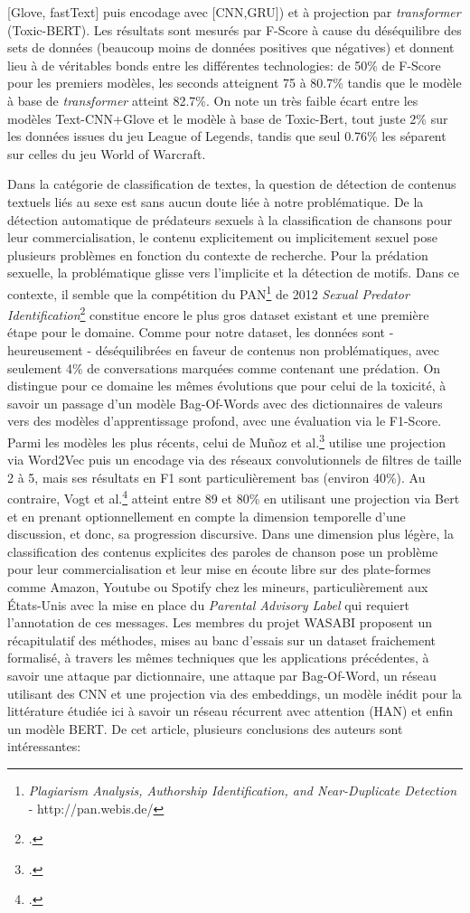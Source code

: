 [Glove, fastText] puis encodage avec [CNN,GRU]) et à projection par \textit{transformer} (Toxic-BERT). Les résultats sont mesurés par F-Score à cause du déséquilibre des sets de données (beaucoup moins de données positives que négatives) et donnent lieu à de véritables bonds entre les différentes technologies: de 50\% de F-Score pour les premiers modèles, les seconds atteignent 75 à 80.7\% tandis que le modèle à base de \textit{transformer} atteint 82.7\%. On note un très faible écart entre les modèles Text-CNN+Glove et le modèle à base de Toxic-Bert, tout juste 2\% sur les données issues du jeu League of Legends, tandis que seul 0.76\% les séparent sur celles du jeu World of Warcraft.

Dans la catégorie de classification de textes, la question de détection de contenus textuels liés au sexe est sans aucun doute liée à notre problématique. De la détection automatique de prédateurs sexuels à la classification de chansons pour leur commercialisation, le contenu explicitement ou implicitement sexuel pose plusieurs problèmes en fonction du contexte de recherche. Pour la prédation sexuelle, la problématique glisse vers l'implicite et la détection de motifs. Dans ce contexte, il semble que la compétition du PAN\footnote{\textit{Plagiarism Analysis, Authorship Identification, and Near-Duplicate Detection} - http://pan.webis.de/} de 2012 \textit{Sexual Predator Identification}\footcite{inches_overview_2012} constitue encore le plus gros dataset existant et une première étape pour le domaine. Comme pour notre dataset, les données sont - heureusement - déséquilibrées en faveur de contenus non problématiques, avec seulement 4\% de conversations marquées comme contenant une prédation. On distingue pour ce domaine les mêmes évolutions que pour celui de la toxicité, à savoir un passage d'un modèle Bag-Of-Words avec des dictionnaires de valeurs vers des modèles d'apprentissage profond, avec une évaluation via le F1-Score. Parmi les modèles les plus récents, celui de Muñoz et al.\footcite{munoz_smartsec4cop_2020} utilise une projection via Word2Vec puis un encodage via des réseaux convolutionnels de filtres de taille 2 à 5, mais ses résultats en F1 sont particulièrement bas (environ 40\%). Au contraire, Vogt et al.\footcite{vogt_early_2021} atteint entre 89 et 80\% en utilisant une projection via Bert et en prenant optionnellement en compte la dimension temporelle d'une discussion, et donc, sa progression discursive. Dans une dimension plus légère, la classification des contenus explicites des paroles de chanson pose un problème pour leur commercialisation et leur mise en écoute libre sur des plate-formes comme Amazon, Youtube ou Spotify chez les mineurs, particulièrement aux États-Unis avec la mise en place du \textit{Parental Advisory Label} qui requiert l'annotation de ces messages. Les membres du projet WASABI proposent un récapitulatif des méthodes, mises au banc d'essais sur un dataset fraichement formalisé, à travers les mêmes techniques que les applications précédentes, à savoir une attaque par dictionnaire, une attaque par Bag-Of-Word, un réseau utilisant des CNN et une projection via des embeddings, un modèle inédit pour la littérature étudiée ici à savoir un réseau récurrent avec attention (HAN) et enfin un modèle BERT. De cet article, plusieurs conclusions des auteurs sont intéressantes:
